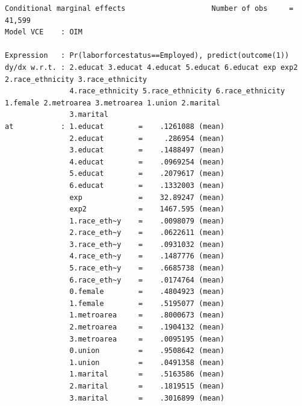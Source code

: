 \documentclass[
]{book}
\begin{document}
\begin{verbatim}
Conditional marginal effects                    Number of obs     =     41,599
Model VCE    : OIM

Expression   : Pr(laborforcestatus==Employed), predict(outcome(1))
dy/dx w.r.t. : 2.educat 3.educat 4.educat 5.educat 6.educat exp exp2 2.race_ethnicity 3.race_ethnicity
               4.race_ethnicity 5.race_ethnicity 6.race_ethnicity 1.female 2.metroarea 3.metroarea 1.union 2.marital
               3.marital
at           : 1.educat        =    .1261088 (mean)
               2.educat        =     .286954 (mean)
               3.educat        =    .1488497 (mean)
               4.educat        =    .0969254 (mean)
               5.educat        =    .2079617 (mean)
               6.educat        =    .1332003 (mean)
               exp             =    32.89247 (mean)
               exp2            =    1467.595 (mean)
               1.race_eth~y    =    .0098079 (mean)
               2.race_eth~y    =    .0622611 (mean)
               3.race_eth~y    =    .0931032 (mean)
               4.race_eth~y    =    .1487776 (mean)
               5.race_eth~y    =    .6685738 (mean)
               6.race_eth~y    =    .0174764 (mean)
               0.female        =    .4804923 (mean)
               1.female        =    .5195077 (mean)
               1.metroarea     =    .8000673 (mean)
               2.metroarea     =    .1904132 (mean)
               3.metroarea     =    .0095195 (mean)
               0.union         =    .9508642 (mean)
               1.union         =    .0491358 (mean)
               1.marital       =    .5163586 (mean)
               2.marital       =    .1819515 (mean)
               3.marital       =    .3016899 (mean)


\end{verbatim}
\end{document}
